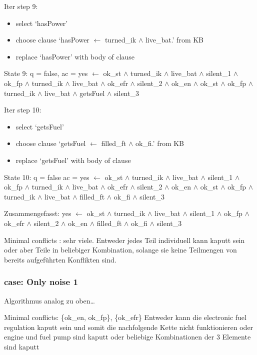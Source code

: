 \documentclass[]{article}
\begin{document}
Iter step 9: 
\begin{itemize}
  \item select `hasPower' 
\item choose clause `hasPower $\leftarrow$ turned\_ik $\wedge$ live\_bat.' from KB 
\item replace `hasPower' with body of clause
\end{itemize}
State 9: q = false, ac = yes $\leftarrow$ ok\_st $\wedge$ turned\_ik $\wedge$ live\_bat $\wedge$ silent\_1 $\wedge$ ok\_fp $\wedge$ turned\_ik $\wedge$ live\_bat $\wedge$ ok\_efr $\wedge$ silent\_2 $\wedge $ ok\_en $\wedge$ ok\_st $\wedge$ ok\_fp $\wedge$ turned\_ik $\wedge$ live\_bat $\wedge$ getsFuel $\wedge$ silent\_3 

Iter step 10: 
\begin{itemize}
  \item select `getsFuel' 
\item choose clause `getsFuel $\leftarrow$ filled\_ft $\wedge$ ok\_fi.' from KB 
\item replace `getsFuel' with body of clause 
\end{itemize}
State 10: q = false ac = yes $\leftarrow$ ok\_st $\wedge$ turned\_ik $\wedge$ live\_bat $\wedge$ silent\_1 $\wedge$ ok\_fp $\wedge$ turned\_ik $\wedge$ live\_bat $\wedge$ ok\_efr $\wedge$ silent\_2 $\wedge$ ok\_en $\wedge$ ok\_st $\wedge$ ok\_fp $\wedge$ turned\_ik $\wedge$ live\_bat $\wedge$ filled\_ft $\wedge$ ok\_fi $\wedge$ silent\_3

Zusammengefasst:\newline
yes $\leftarrow$ ok\_st $\wedge$ turned\_ik $\wedge$ live\_bat $\wedge$ silent\_1 $\wedge$ ok\_fp $\wedge$ ok\_efr $\wedge$ silent\_2 $\wedge$ ok\_en $\wedge$ filled\_ft $\wedge$ ok\_fi $\wedge$ silent\_3

Minimal conflicts : sehr viele. Entweder jedes Teil individuell kann
kaputt sein oder aber Teile in beliebiger Kombination, solange sie keine
Teilmengen von bereits aufgeführten Konflikten sind.\pagebreak

\subsubsection{case: Only noise 1}
Algorithmus analog zu oben\ldots{}

Minimal conflicts: \{ok\_en, ok\_fp\}, \{ok\_efr\} Entweder kann die
electronic fuel regulation kaputt sein und somit die nachfolgende Kette
nicht funktionieren oder engine und fuel pump sind kaputt oder beliebige
Kombinationen der 3 Elemente sind kaputt
\end{document}
